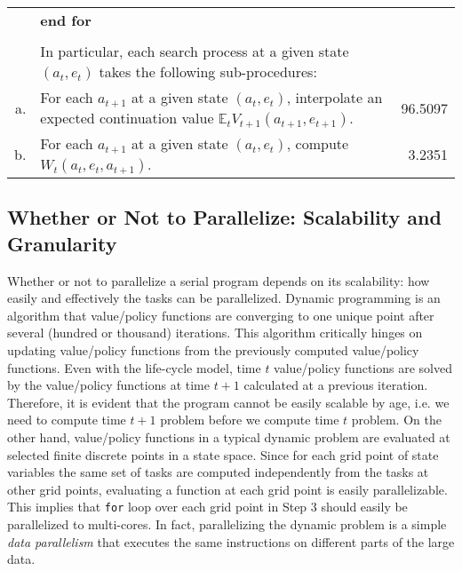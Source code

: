 \documentclass[12pt]{article}
\begin{document}
\begin{table}[h!]
\begin{tabular}{r p{12cm} r}
&  \textbf{end for}\\
&\\
& In particular, each search process at a given state $(a_{t},e_{t})$ takes the following sub-procedures:\\
		a.& For each $a_{t+1}$ at a given state $(a_t,e_t)$, interpolate an expected continuation value $\mathbb{E}_t V_{t+1}(a_{t+1},e_{t+1})$. & 96.5097\\
		b.& For each $a_{t+1}$ at a given state $(a_t,e_t)$, compute $W_t(a_{t},e_t,a_{t+1})$. &3.2351\\
\hline
\end{tabular}
\end{table}

\subsection{Whether or Not to Parallelize: Scalability and Granularity}
Whether or not to parallelize a serial program depends on its scalability: how easily and effectively the tasks can be parallelized. Dynamic programming is an algorithm that value/policy functions are converging to one unique point after several (hundred or thousand) iterations. This algorithm critically hinges on updating value/policy functions from the previously computed value/policy functions. Even with the life-cycle model, time $t$ value/policy functions are solved by the value/policy functions at time $t+1$ calculated at a previous iteration. Therefore, it is evident that the program cannot be easily scalable by age, i.e. we need to compute time $t+1$ problem before we compute time $t$ problem. On the other hand, value/policy functions in a typical dynamic problem are evaluated at selected finite discrete points in a state space. Since for each grid point of state variables the same set of tasks are computed independently from the tasks at other grid points, evaluating a function at each grid point is easily parallelizable. This implies that \texttt{for} loop over each grid point in Step 3 should easily be parallelized to multi-cores. In fact, parallelizing the dynamic problem is a simple \textit{data parallelism} that executes the same instructions on different parts of the large data.
\end{document}
